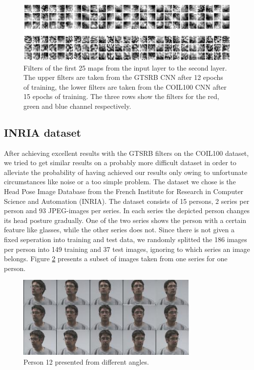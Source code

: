 \documentclass[11pt, a4paper]{article}
\begin{document}
\begin{figure}[h!]
	\centering
	\includegraphics[width=1\textwidth]{gtsrb_vs_coil_filters.png}
	\caption{Filters of the first 25 maps from the input layer to the second layer. The upper filters are taken from the GTSRB CNN after 12 epochs of training, the lower filters are taken from the COIL100 CNN after 15 epochs of training. The three rows show the filters for the red, green and blue channel respectively.}
	\label{fig:gtsrb_vs_coil_filters}
\end{figure}


\subsection{INRIA dataset}
\label{subsec:inria}

After achieving excellent results with the GTSRB filters on the COIL100 dataset, we tried to get similar results on a probably more difficult dataset in order to alleviate the probability of having achieved our results only owing to unfortunate circumstances like noise or a too simple problem. The dataset we chose is the Head Pose Image Database \cite{estimating-face-orientation-inria} from the French Institute for Research in Computer Science and Automation (INRIA). The dataset consists of 15 persons, 2 series per person and 93 JPEG-images per series. In each series the depicted person changes its head posture gradually. One of the two series shows the person with a certain feature like glasses, while the other series does not. Since there is not given a fixed seperation into training and test data, we randomly splitted the 186 images per person into 149 training and 37 test images, ignoring to which series an image belongs. Figure \ref{fig:inria_different_angles} presents a subset of images taken from one series for one person.

\begin{figure}[h!]
	\centering
	\includegraphics[width=0.8\textwidth]{inria_different_angles}
	\caption{Person 12 presented from different angles.}
	\label{fig:inria_different_angles}
\end{figure}
\end{document}
